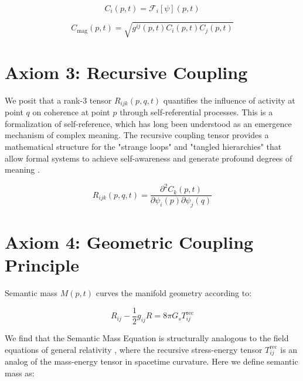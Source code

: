 \begin{equation}
C_i(p,t) = \mathcal{F}_i[\psi](p,t)
\end{equation}

\begin{equation}
C_{\text{mag}}(p,t) = \sqrt{g^{ij}(p,t) C_i(p,t) C_j(p,t)}
\end{equation}


\section{Axiom 3: Recursive Coupling}
\label{sec:axiom_3}

We posit that a rank-3 tensor \(R_{ijk}(p,q,t)\) quantifies the influence of activity at point \(q\) on coherence at point \(p\) through self-referential processes. This is a formalization of self-reference, which has long been understood as an emergence mechanism of complex meaning. The recursive coupling tensor provides a mathematical structure for the "strange loops" and "tangled hierarchies" that allow formal systems to achieve self-awareness and generate profound degrees of meaning \autocite{Hofstadter1979}.

\begin{equation}
R_{ijk}(p,q,t) = \frac{\partial^2 C_k(p,t)}{\partial \psi_i(p) \partial \psi_j(q)}
\end{equation}


\section{Axiom 4: Geometric Coupling Principle}
\label{sec:axiom_4}

Semantic mass \(M(p,t)\) curves the manifold geometry according to:

\begin{equation}
R_{ij} - \frac{1}{2}g_{ij}R = 8\pi G_s T^{\text{rec}}_{ij}
\end{equation}

We find that the Semantic Mass Equation is structurally analogous to the field equations of general relativity \autocite{Einstein1915, MisnerThorneWheeler1973, Wald1984}, where the recursive stress-energy tensor \(T^{\text{rec}}_{ij}\) is an analog of the mass-energy tensor in spacetime curvature. Here we define semantic mass as:

